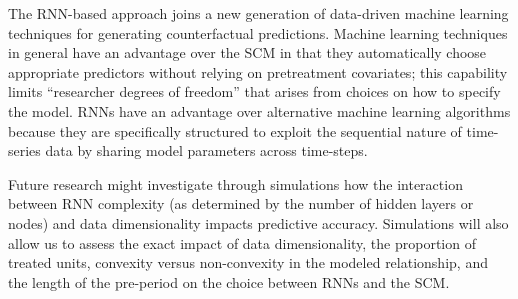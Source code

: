 \documentclass[hidelinks,12pt]{article}
\begin{document}
The RNN-based approach joins a new generation of data-driven machine learning techniques for generating counterfactual predictions. Machine learning techniques in general have an advantage over the SCM in that they automatically choose appropriate predictors without relying on pretreatment covariates; this capability limits ``researcher degrees of freedom'' that arises from choices on how to specify the model. RNNs have an advantage over alternative machine learning algorithms because they are specifically structured to exploit the sequential nature of time-series data by sharing model parameters across time-steps.

Future research might investigate through simulations how the interaction between RNN complexity (as determined by the number of hidden layers or nodes) and data dimensionality impacts predictive accuracy. Simulations will also allow us to assess the exact impact of data dimensionality, the proportion of treated units, convexity versus non-convexity in the modeled relationship, and the length of the pre-period on the choice between RNNs and the SCM. %

\newpage


\begin{singlespace}
	\begin{footnotesize}
		\begin{multicols}{2}
			
		\end{multicols}
	\end{footnotesize}
\end{singlespace}

\itemize
\end{document}
